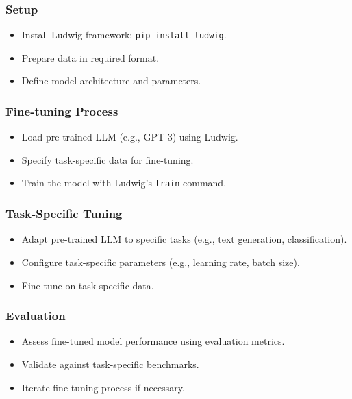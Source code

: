 \begin{frame}[fragile]\frametitle{Setup}
    \begin{itemize}
        \item Install Ludwig framework: \lstinline{pip install ludwig}.
        \item Prepare data in required format.
        \item Define model architecture and parameters.
    \end{itemize}
\end{frame}

\begin{frame}[fragile]\frametitle{Fine-tuning Process}
    \begin{itemize}
        \item Load pre-trained LLM (e.g., GPT-3) using Ludwig.
        \item Specify task-specific data for fine-tuning.
        \item Train the model with Ludwig's \lstinline{train} command.
    \end{itemize}
\end{frame}

\begin{frame}[fragile]\frametitle{Task-Specific Tuning}
    \begin{itemize}
        \item Adapt pre-trained LLM to specific tasks (e.g., text generation, classification).
        \item Configure task-specific parameters (e.g., learning rate, batch size).
        \item Fine-tune on task-specific data.
    \end{itemize}
\end{frame}

\begin{frame}[fragile]\frametitle{Evaluation}
    \begin{itemize}
        \item Assess fine-tuned model performance using evaluation metrics.
        \item Validate against task-specific benchmarks.
        \item Iterate fine-tuning process if necessary.
    \end{itemize}
\end{frame}


